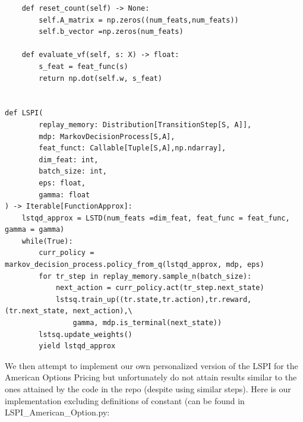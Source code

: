 \documentclass{article}[12pt]
\begin{document}
\begin{lstlisting}
    def reset_count(self) -> None:
        self.A_matrix = np.zeros((num_feats,num_feats))
        self.b_vector =np.zeros(num_feats)

    def evaluate_vf(self, s: X) -> float:
        s_feat = feat_func(s)
        return np.dot(self.w, s_feat)


def LSPI(
        replay_memory: Distribution[TransitionStep[S, A]],
        mdp: MarkovDecisionProcess[S,A],
        feat_funct: Callable[Tuple[S,A],np.ndarray],
        dim_feat: int,
        batch_size: int,
        eps: float,
        gamma: float
) -> Iterable[FunctionApprox]:
    lstqd_approx = LSTD(num_feats =dim_feat, feat_func = feat_func, gamma = gamma) 
    while(True):
        curr_policy = markov_decision_process.policy_from_q(lstqd_approx, mdp, eps)
        for tr_step in replay_memory.sample_n(batch_size):
            next_action = curr_policy.act(tr_step.next_state)
            lstsq.train_up((tr.state,tr.action),tr.reward,(tr.next_state, next_action),\
                gamma, mdp.is_terminal(next_state))
        lstsq.update_weights()
        yield lstqd_approx
\end{lstlisting}

We then attempt to implement our own personalized version of the LSPI for the American Options Pricing but unfortunately do not attain results similar to the ones attained by the code in the repo (despite using similar steps). Here is our implementation excluding definitions of constant (can be found in LSPI\_American\_Option.py:
\end{document}
